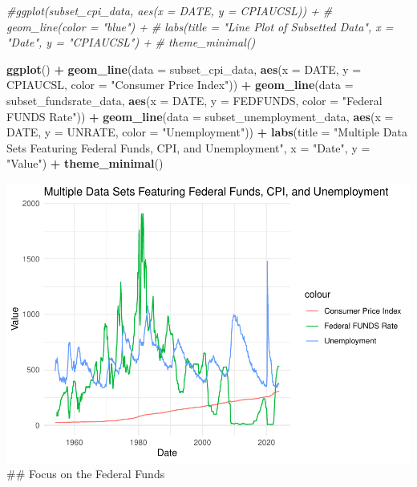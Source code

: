 \documentclass[
]{article}
\newenvironment{Shaded}{\begin{snugshade}}{\end{snugshade}}
\newcommand{\AttributeTok}[1]{\textcolor[rgb]{0.13,0.29,0.53}{#1}}
\newcommand{\CommentTok}[1]{\textcolor[rgb]{0.56,0.35,0.01}{\textit{#1}}}
\newcommand{\FunctionTok}[1]{\textcolor[rgb]{0.13,0.29,0.53}{\textbf{#1}}}
\newcommand{\NormalTok}[1]{#1}
\newcommand{\SpecialCharTok}[1]{\textcolor[rgb]{0.81,0.36,0.00}{\textbf{#1}}}
\newcommand{\StringTok}[1]{\textcolor[rgb]{0.31,0.60,0.02}{#1}}
\begin{document}
\begin{Shaded}
\begin{Highlighting}[]
\CommentTok{\#ggplot(subset\_cpi\_data, aes(x = DATE, y = CPIAUCSL)) +}
\CommentTok{\#  geom\_line(color = "blue") +}
\CommentTok{\#  labs(title = "Line Plot of Subsetted Data", x = "Date", y = "CPIAUCSL") +}
\CommentTok{\#  theme\_minimal()}




\FunctionTok{ggplot}\NormalTok{() }\SpecialCharTok{+}
  \FunctionTok{geom\_line}\NormalTok{(}\AttributeTok{data =}\NormalTok{ subset\_cpi\_data, }\FunctionTok{aes}\NormalTok{(}\AttributeTok{x =}\NormalTok{ DATE, }\AttributeTok{y =}\NormalTok{ CPIAUCSL, }\AttributeTok{color =} \StringTok{"Consumer Price Index"}\NormalTok{)) }\SpecialCharTok{+}
  \FunctionTok{geom\_line}\NormalTok{(}\AttributeTok{data =}\NormalTok{ subset\_fundsrate\_data, }\FunctionTok{aes}\NormalTok{(}\AttributeTok{x =}\NormalTok{ DATE, }\AttributeTok{y =}\NormalTok{ FEDFUNDS, }\AttributeTok{color =} \StringTok{"Federal FUNDS Rate"}\NormalTok{)) }\SpecialCharTok{+}
  \FunctionTok{geom\_line}\NormalTok{(}\AttributeTok{data =}\NormalTok{ subset\_unemployment\_data, }\FunctionTok{aes}\NormalTok{(}\AttributeTok{x =}\NormalTok{ DATE, }\AttributeTok{y =}\NormalTok{ UNRATE, }\AttributeTok{color =} \StringTok{"Unemployment"}\NormalTok{)) }\SpecialCharTok{+}
  \FunctionTok{labs}\NormalTok{(}\AttributeTok{title =} \StringTok{"Multiple Data Sets Featuring Federal Funds, CPI, and Unemployment"}\NormalTok{, }\AttributeTok{x =} \StringTok{"Date"}\NormalTok{, }\AttributeTok{y =} \StringTok{"Value"}\NormalTok{) }\SpecialCharTok{+}
  \FunctionTok{theme\_minimal}\NormalTok{()}
\end{Highlighting}
\end{Shaded}

\includegraphics{Story_2_Joe_Garcia_files/figure-latex/unnamed-chunk-3-1.pdf}
\#\# Focus on the Federal Funds
\end{document}
